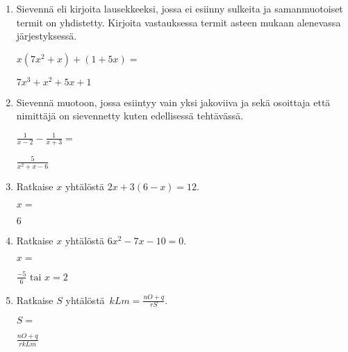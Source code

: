 \documentclass[finnish, a4paper, 12pt]{article}
\begin{document}
\begin{enumerate}[leftmargin=*]
		\vspace{8pt}
		
		\item %
		Sievennä eli kirjoita lausekkeeksi, jossa ei esiinny sulkeita ja 
		samanmuotoiset termit on yhdistetty. 
		Kirjoita vastauksessa termit asteen mukaan alenevassa järjestyksessä. 
		
		\(
		\displaystyle
		x(7x^2 + x) + (1 + 5x) = 
		\) %
		\begin{version:withAnswers}
		\( 7x^3 +x^2 +5x +1 \)
		\end{version:withAnswers}
		
		\vspace{8pt}
		
		\item %
		Sievennä %
		muotoon, jossa esiintyy vain yksi jakoviiva ja sekä osoittaja
		että nimittäjä on sievennetty kuten edellisessä tehtävässä.
		
		\(
		\displaystyle
		\frac{1}{x-2}- \frac{1}{x + 3} =
		\) %
		\begin{version:withAnswers}
		\( \frac{5}{x^2+x-6} \)
		\end{version:withAnswers}
		
		\vspace{8pt}
		
		\item %
		Ratkaise \(x\) yhtälöstä \(2x + 3(6 - x) = 12\).
		
		\(
		x = 
		\)	%
		\begin{version:withAnswers}
		 \( 6 \)
		\end{version:withAnswers}
		\vspace{8pt}
		
		\item %
		Ratkaise \(x\) yhtälöstä \(6x^2-7x-10= 0\).
		
		\(
		x = 		
		\)	%
		
		\begin{version:withAnswers}
		\(\frac{-5}{6} \text{  tai } x = 2\)
		\end{version:withAnswers}
		\vspace{8pt}
		
		\item %
		Ratkaise \(S\) yhtälöstä 
		\(
		\displaystyle \,
		kLm = \frac{nO+q}{rS} .
		\)	
		
		\(
		S = 
		\) %
		\begin{version:withAnswers}
		\( \frac{nO+q}{rkLm}\)
		\end{version:withAnswers}
		
	\end{enumerate}
	
	
\end{document}
